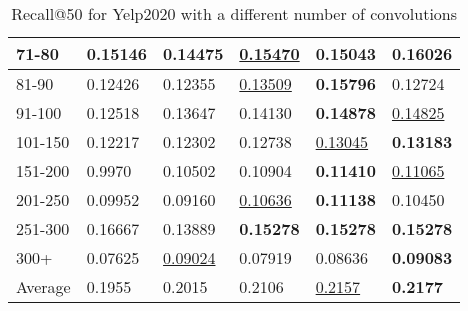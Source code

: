 \begin{table*}[]
\begin{tabular}{|l|l|l|l|l|l|}
        71-80     & 0.15146                    & 0.14475                    & \underline{0.15470}        & 0.15043                    & \textbf{0.16026}           \\ \hline
        81-90     & 0.12426                    & 0.12355                    & \underline{0.13509}        & \textbf{0.15796}           & 0.12724                    \\ \hline
        91-100    & 0.12518                    & 0.13647                    & 0.14130                    & \textbf{0.14878}           & \underline{0.14825}        \\ \hline
        101-150   & 0.12217                    & 0.12302                    & 0.12738                    & \underline{0.13045}        & \textbf{0.13183}           \\ \hline
        151-200   & 0.9970                     & 0.10502                    & 0.10904                    & \textbf{0.11410}           & \underline{0.11065}        \\ \hline
        201-250   & 0.09952                    & 0.09160                    & \underline{0.10636}        & \textbf{0.11138}           & 0.10450                    \\ \hline
        251-300   & 0.16667                    & 0.13889                    & \textbf{0.15278}           & \textbf{0.15278}           & \textbf{0.15278}           \\ \hline
        300+      & 0.07625                    & \underline{0.09024}        & 0.07919                    & 0.08636                    & \textbf{0.09083}           \\ \hline
        Average   & 0.1955                     & 0.2015                     & 0.2106                     & \underline{0.2157}         & \textbf{0.2177}            \\ \hline
    \end{tabular}
    \caption{Recall@50 for Yelp2020 with a different number of convolutions}
    \label{tab:Yelp2020-recall-evaluation-mean}
\end{table*}

